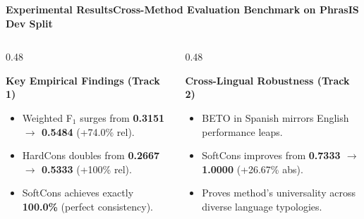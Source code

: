 \documentclass[aspectratio=169,10pt]{beamer}
\begin{document}
\begin{frame}{\textbf{Experimental Results}}{\textbf{Cross-Method Evaluation Benchmark on PhrasIS Dev Split}}
  \vspace{0.15cm}
  \begin{columns}[T]
    \begin{column}{0.48\textwidth}
      \begin{block}{\textbf{Key Empirical Findings (Track 1)}}
        \scriptsize
        \begin{itemize}\setlength{\itemsep}{1pt}\setlength{\parskip}{0pt}
          \item Weighted F$_1$ surges from \textbf{0.3151 $\to$ 0.5484} (+74.0\% rel).
          \item HardCons doubles from \textbf{0.2667 $\to$ 0.5333} (+100\% rel).
          \item SoftCons achieves exactly \textbf{100.0\%} (perfect consistency).
        \end{itemize}
      \end{block}
    \end{column}
    \begin{column}{0.48\textwidth}
      \begin{block}{\textbf{Cross-Lingual Robustness (Track 2)}}
        \scriptsize
        \begin{itemize}\setlength{\itemsep}{1pt}\setlength{\parskip}{0pt}
          \item BETO in Spanish mirrors English performance leaps.
          \item SoftCons improves from \textbf{0.7333 $\to$ 1.0000} (+26.67\% abs).
          \item Proves method's universality across diverse language typologies.
        \end{itemize}
      \end{block}
    \end{column}
  \end{columns}
\end{frame}
\end{document}
